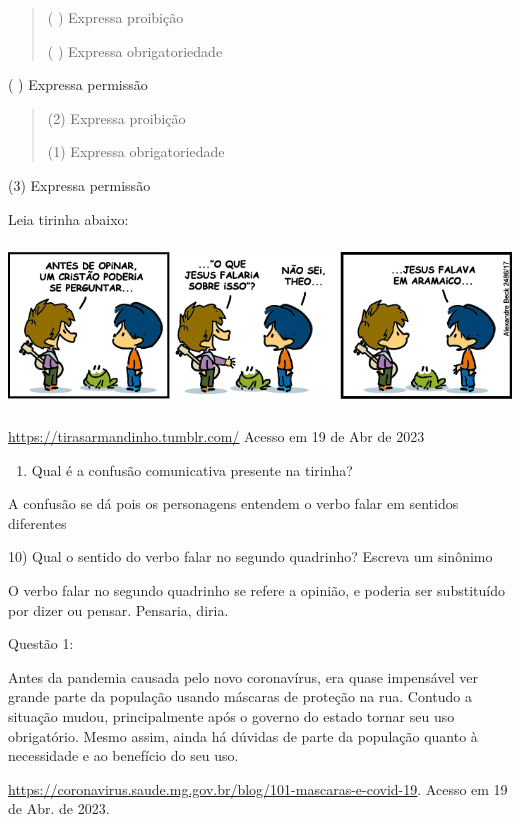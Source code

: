 \begin{quote}
( ) Expressa proibição

( ) Expressa obrigatoriedade
\end{quote}

( ) Expressa permissão

\begin{quote}
(2) Expressa proibição

(1) Expressa obrigatoriedade
\end{quote}

(3) Expressa permissão

Leia tirinha abaixo:

\includegraphics[width=5.90551in,height=1.72222in]{./imgSAEB_7_POR/media/image11.png}

\href{https://tirasarmandinho.tumblr.com/}{\uline{https://tirasarmandinho.tumblr.com/}}
Acesso em 19 de Abr de 2023

\begin{enumerate}
\def\labelenumi{\arabic{enumi}.}
\tightlist
\item
  Qual é a confusão comunicativa presente na tirinha?
\end{enumerate}

A confusão se dá pois os personagens entendem o verbo falar em sentidos
diferentes

10) Qual o sentido do verbo falar no segundo quadrinho? Escreva um
sinônimo

O verbo falar no segundo quadrinho se refere a opinião, e poderia ser
substituído por dizer ou pensar. Pensaria, diria.


Questão 1:

Antes da pandemia causada pelo novo coronavírus, era quase impensável
ver grande parte da população usando máscaras de proteção na rua.
Contudo a situação mudou, principalmente após o governo do estado tornar
seu uso obrigatório. Mesmo assim, ainda há dúvidas de parte da população
quanto à necessidade e ao benefício do seu uso.

\href{https://coronavirus.saude.mg.gov.br/blog/101-mascaras-e-covid-19}{\uline{https://coronavirus.saude.mg.gov.br/blog/101-mascaras-e-covid-19}}.
Acesso em 19 de Abr. de 2023.

